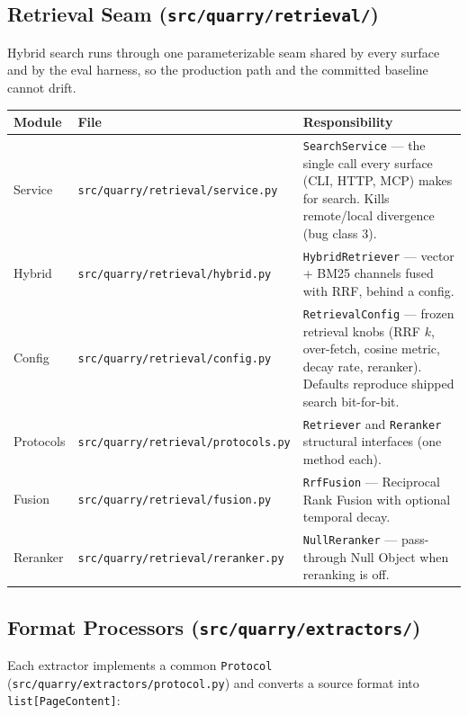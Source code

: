 \documentclass[a4paper,10pt]{article}
\newcommand{\modpath}[1]{\texttt{src/quarry/#1}}
\begin{document}
\subsection{Retrieval Seam (\modpath{retrieval/})}

Hybrid search runs through one parameterizable seam shared by every
surface and by the eval harness, so the production path and the
committed baseline cannot drift.

\begin{center}
\begin{tabular}{llp{7cm}}
\toprule
\textbf{Module} & \textbf{File} & \textbf{Responsibility} \\
\midrule
Service    & \modpath{retrieval/service.py}   & \texttt{SearchService}
             --- the single call every surface (CLI, HTTP, MCP) makes
             for search.  Kills remote/local divergence (bug class 3). \\
Hybrid     & \modpath{retrieval/hybrid.py}    & \texttt{HybridRetriever}
             --- vector + BM25 channels fused with RRF, behind a
             config. \\
Config     & \modpath{retrieval/config.py}    & \texttt{RetrievalConfig}
             --- frozen retrieval knobs (RRF $k$, over-fetch, cosine
             metric, decay rate, reranker).  Defaults reproduce shipped
             search bit-for-bit. \\
Protocols  & \modpath{retrieval/protocols.py} & \texttt{Retriever} and
             \texttt{Reranker} structural interfaces (one method
             each). \\
Fusion     & \modpath{retrieval/fusion.py}    & \texttt{RrfFusion} ---
             Reciprocal Rank Fusion with optional temporal decay. \\
Reranker   & \modpath{retrieval/reranker.py}  & \texttt{NullReranker}
             --- pass-through Null Object when reranking is off. \\
\bottomrule
\end{tabular}
\end{center}

\subsection{Format Processors (\modpath{extractors/})}

Each extractor implements a common \texttt{Protocol}
(\modpath{extractors/protocol.py}) and converts a source format into
\texttt{list[PageContent]}:
\end{document}
